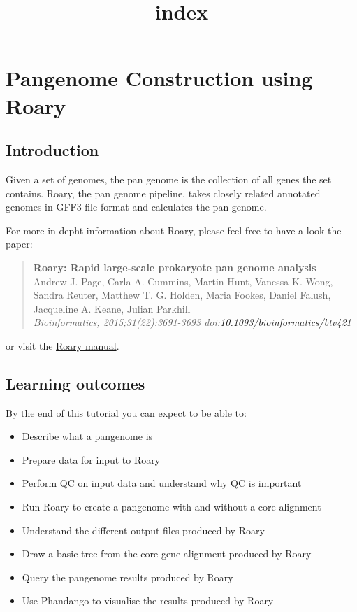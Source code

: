 \documentclass[11pt]{article}
\title{index}
\providecommand{\tightlist}{%
      \setlength{\itemsep}{0pt}\setlength{\parskip}{0pt}}
\begin{document}
    \hypertarget{pangenome-construction-using-roary}{%
\section{Pangenome Construction using
Roary}\label{pangenome-construction-using-roary}}

\hypertarget{introduction}{%
\subsection{Introduction}\label{introduction}}

Given a set of genomes, the pan genome is the collection of all genes
the set contains. Roary, the pan genome pipeline, takes closely related
annotated genomes in GFF3 file format and calculates the pan genome.

For more in depht information about Roary, please feel free to have a
look the paper:

\begin{quote}
\textbf{Roary: Rapid large-scale prokaryote pan genome analysis}\\
Andrew J. Page, Carla A. Cummins, Martin Hunt, Vanessa K. Wong, Sandra
Reuter, Matthew T. G. Holden, Maria Fookes, Daniel Falush, Jacqueline A.
Keane, Julian Parkhill\\
\textit{Bioinformatics, 2015;31(22):3691-3693
doi:\href{http://bioinformatics.oxfordjournals.org/content/31/22/3691}{10.1093/bioinformatics/btv421}}
\end{quote}

or visit the \href{http://sanger-pathogens.github.io/Roary/}{Roary
manual}.

\hypertarget{learning-outcomes}{%
\subsection{Learning outcomes}\label{learning-outcomes}}

By the end of this tutorial you can expect to be able to:

\begin{itemize}
\tightlist
\item
  Describe what a pangenome is
\item
  Prepare data for input to Roary
\item
  Perform QC on input data and understand why QC is important
\item
  Run Roary to create a pangenome with and without a core alignment
\item
  Understand the different output files produced by Roary
\item
  Draw a basic tree from the core gene alignment produced by Roary
\item
  Query the pangenome results produced by Roary
\item
  Use Phandango to visualise the results produced by Roary
\end{itemize}
\end{document}
